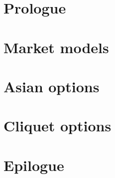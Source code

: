 \documentclass[12pt,a4paper,oneside]{amsbook}
\begin{document}
\mainmatter

\chapter{Prologue}
\label{cha:prologue}


\chapter{Market models}
\label{cha:models}


\chapter{Asian options}
\label{cha:asian}


\chapter{Cliquet options}
\label{cha:cliquet}


\chapter{Epilogue}
\label{cha:epilogue}







\backmatter

\listoffigures

\listoftables


\printbibliography
\end{document}
